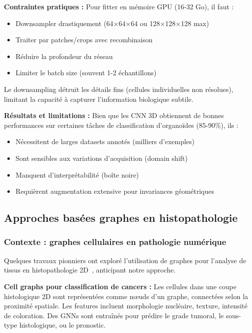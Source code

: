 \textbf{Contraintes pratiques :}
Pour fitter en mémoire GPU (16-32 Go), il faut :
\begin{itemize}
    \item Downsampler drastiquement (64×64×64 ou 128×128×128 max)
    \item Traiter par patches/crops avec recombinaison
    \item Réduire la profondeur du réseau
    \item Limiter le batch size (souvent 1-2 échantillons)
\end{itemize}

Le downsampling détruit les détails fins (cellules individuelles non résolues), limitant la capacité à capturer l'information biologique subtile.

\textbf{Résultats et limitations :}
Bien que les CNN 3D obtiennent de bonnes performances sur certaines tâches de classification d'organoïdes (85-90\%), ils :
\begin{itemize}
    \item Nécessitent de larges datasets annotés (milliers d'exemples)
    \item Sont sensibles aux variations d'acquisition (domain shift)
    \item Manquent d'interprétabilité (boîte noire)
    \item Requièrent augmentation extensive pour invariances géométriques
\end{itemize}

\subsection{Approches basées graphes en histopathologie}

\subsubsection{Contexte : graphes cellulaires en pathologie numérique}

Quelques travaux pionniers ont exploré l'utilisation de graphes pour l'analyse de tissus en histopathologie 2D~\cite{Zhou2019,Jaume2021,Pati2022}, anticipant notre approche.

\textbf{Cell graphs pour classification de cancers :}
Les cellules dans une coupe histologique 2D sont représentées comme nœuds d'un graphe, connectées selon la proximité spatiale. Les features incluent morphologie nucléaire, texture, intensité de coloration. Des GNNs sont entraînés pour prédire le grade tumoral, le sous-type histologique, ou le pronostic.


